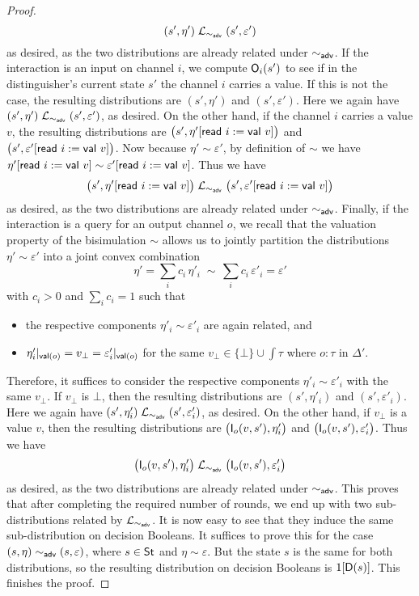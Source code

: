 \begin{proof}
\[(s',\eta') \; \mathcal{L}_{\sim_{\mathsf{adv}}} \; (s',\varepsilon')\]
as desired, as the two distributions are already related under $\sim_{\mathsf{adv}}$. If the interaction is an input on channel $i$, we compute $\mathsf{O}_i(s')$ to see if in the distinguisher's current state $s'$ the channel $i$ carries a value. If this is not the case, the resulting distributions are $(s',\eta')$ and $(s',\varepsilon')$. Here we again have $(s',\eta') \; \mathcal{L}_{\sim_{\mathsf{adv}}} \; (s',\varepsilon')$, as desired. On the other hand, if the channel $i$ carries a value $v$, the resulting distributions are $\big(s',\eta'[\mathsf{read} \ i := \mathsf{val} \ v]\big)$ and $\big(s',\varepsilon'[\mathsf{read} \ i := \mathsf{val} \ v]\big)$. Now because $\eta' \sim \varepsilon'$, by definition of $\sim$ we have $\eta'[\mathsf{read} \ i := \mathsf{val} \ v] \sim \varepsilon'[\mathsf{read} \ i := \mathsf{val} \ v]$. Thus we have
\[\big(s',\eta'[\mathsf{read} \ i := \mathsf{val} \ v]\big) \; \mathcal{L}_{\sim_{\mathsf{adv}}} \; \big(s',\varepsilon'[\mathsf{read} \ i := \mathsf{val} \ v]\big)\]
as desired, as the two distributions are already related under $\sim_{\mathsf{adv}}$. Finally, if the interaction is a query for an output channel $o$, we recall that the valuation property of the bisimulation $\sim$ allows us to jointly partition the distributions $\eta' \sim \varepsilon'$ into a joint convex combination \[\eta' = \sum_i c_i \, \eta'_i \; \sim \, \sum_i c_i \, \varepsilon'_i = \varepsilon'\]
with $c_i > 0$ and $\sum_i c_i = 1$ such that
\begin{itemize}
\item the respective components $\eta'_i \sim \varepsilon'_i$ are again related, and
\item $\eta'_i|_{\mathsf{val}(o)} = v_\bot = \varepsilon'_i|_{\mathsf{val}(o)}$ for the same $v_\bot \in \{\bot\} \cup \int{\tau}$ where $o : \tau$ in $\Delta'$.
\end{itemize}
Therefore, it suffices to consider the respective components $\eta'_i \sim \varepsilon'_i$ with the same $v_\bot$. If $v_\bot$ is $\bot$, then the resulting distributions are $(s',\eta'_i)$ and $(s',\varepsilon'_i)$. Here we again have $(s',\eta'_i) \; \mathcal{L}_{\sim_{\mathsf{adv}}} \; (s',\varepsilon'_i)$, as desired. On the other hand, if $v_\bot$ is a value $v$, then the resulting distributions are $\big(\mathsf{I}_o(v,s'),\eta'_i\big)$ and $\big(\mathsf{I}_o(v,s'),\varepsilon'_i\big)$. Thus we have
\[\big(\mathsf{I}_o(v,s'),\eta'_i\big) \; \mathcal{L}_{\sim_{\mathsf{adv}}} \; \big(\mathsf{I}_o(v,s'),\varepsilon'_i\big)\]
as desired, as the two distributions are already related under $\sim_{\mathsf{adv}}$. This proves that after completing the required number of rounds, we end up with two sub-distributions related by $\mathcal{L}_{\sim_{\mathsf{adv}}}$. It is now easy to see that they induce the same sub-distribution on decision Booleans. It suffices to prove this for the case $(s,\eta) \sim_{\mathsf{adv}} (s,\varepsilon)$, where $s \in \mathsf{St}$ and $\eta \sim \varepsilon$. But the state $s$ is the same for both distributions, so the resulting distribution on decision Booleans is $1[\mathsf{D}(s)]$. This finishes the proof.
\end{proof}

